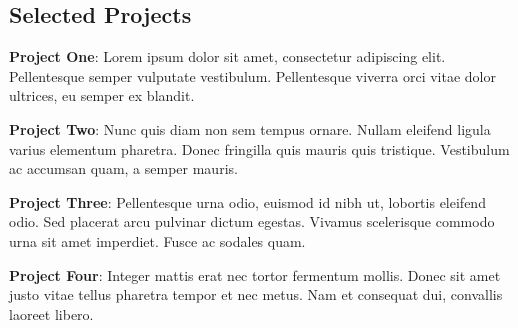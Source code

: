 \documentclass[margin]{res}
\begin{document}
\begin{resume}

% 

\section{Selected Projects}
\par
\textbf{Project One}: 
Lorem ipsum dolor sit amet, consectetur adipiscing elit. Pellentesque semper 
vulputate vestibulum. Pellentesque viverra orci vitae dolor ultrices, eu semper 
ex blandit. 

\par
\textbf{Project Two}:
Nunc quis diam non sem tempus ornare. Nullam eleifend ligula varius 
elementum pharetra. Donec fringilla quis mauris quis tristique. Vestibulum ac 
accumsan quam, a semper mauris. 
\par
\textbf{Project Three}: 
Pellentesque urna odio, euismod id nibh ut,  lobortis eleifend odio. Sed 
placerat arcu pulvinar dictum egestas. Vivamus  scelerisque commodo urna sit 
amet imperdiet. Fusce ac sodales quam.

\par
\textbf{Project Four}: 
Integer mattis erat nec tortor fermentum mollis. Donec sit amet justo vitae 
tellus pharetra tempor et nec metus. Nam et consequat dui, convallis laoreet 
libero. 


\end{resume}
\end{document}
